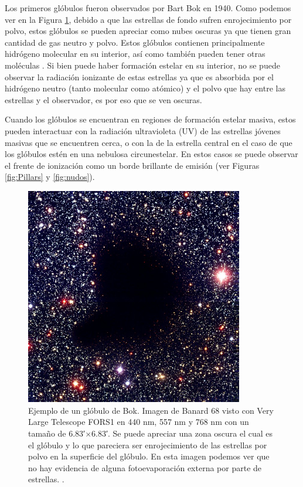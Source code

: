 \documentclass{book}
\begin{document}
Los primeros glóbulos fueron observados por Bart Bok en 1940. Como podemos ver en la Figura \ref{fig:Banard}, debido a que las estrellas de fondo sufren enrojecimiento por polvo, estos glóbulos se pueden apreciar como nubes oscuras ya que tienen gran cantidad de gas neutro y polvo. Estos glóbulos contienen principalmente hidrógeno molecular en su interior, así como también pueden tener otras moléculas \citep{Amin:2005, DFrancesco:2002}. Si bien puede haber formación estelar en su interior, no se puede observar la radiación ionizante de estas estrellas ya que es absorbida por el hidrógeno neutro (tanto molecular como atómico) y el polvo que hay entre las estrellas y el observador, es por eso que se ven oscuras.

Cuando los glóbulos se encuentran en regiones de formación estelar masiva, estos pueden interactuar con la radiación ultravioleta (UV) de las estrellas jóvenes masivas que se encuentren cerca, o con la de la estrella central en el caso de que los glóbulos estén en una nebulosa circunestelar. En estos casos se puede observar el frente de ionización como un borde brillante de emisión (ver Figuras \ref{fig:Pillars} y \ref{fig:nudos}).

\begin{figure}[htb]
    \centering
    \includegraphics[width=0.85\textwidth]{images Chapter 1/C1_Bok_globule.jpg}
    \caption{Ejemplo de un glóbulo de Bok. Imagen de Banard 68 visto con Very Large Telescope FORS1 en 440 nm, 557 nm y 768 nm con un tamaño de \ang{;6.83;}$\times$\ang{;6.83;}. Se puede apreciar una zona oscura el cual es el glóbulo y lo que pareciera ser enrojecimiento de las estrellas por polvo en la superficie del glóbulo. En esta imagen podemos ver que no hay evidencia de alguna fotoevaporación externa por parte de estrellas. \citep{Alves:2001}.}
    \label{fig:Banard}
\end{figure}
\end{document}
